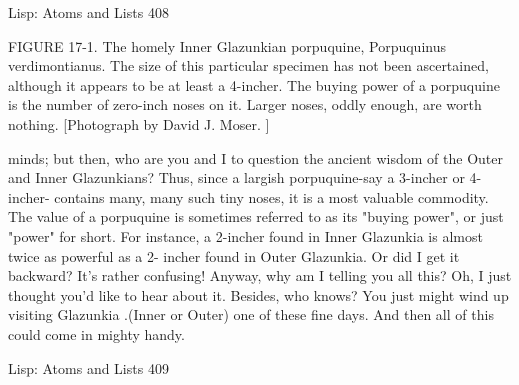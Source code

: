 Lisp: Atoms and Lists                                                                 408

FIGURE 17-1. The homely Inner Glazunkian porpuquine, Porpuquinus
verdimontianus. The size of this particular specimen has not been ascertained,
although it appears to be at least a 4-incher. The buying power of a porpuquine is the
number of zero-inch noses on it. Larger noses, oddly enough, are worth nothing.
[Photograph by David J. Moser. ]

minds; but then, who are you and I to question the ancient wisdom of the Outer and
Inner Glazunkians? Thus, since a largish porpuquine-say a 3-incher or 4-incher-
contains many, many such tiny noses, it is a most valuable commodity. The value of a
porpuquine is sometimes referred to as its "buying power", or just "power" for short.
For instance, a 2-incher found in Inner Glazunkia is almost twice as powerful as a 2-
incher found in Outer Glazunkia. Or did I get it backward? It's rather confusing!
        Anyway, why am I telling you all this? Oh, I just thought you'd like to hear
about it. Besides, who knows? You just might wind up visiting Glazunkia .(Inner or
Outer) one of these fine days. And then all of this could come in mighty handy.




Lisp: Atoms and Lists                                                             409

